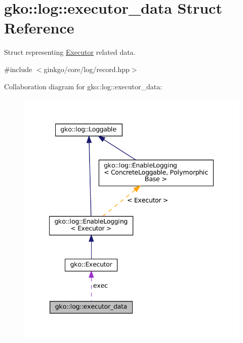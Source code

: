 \hypertarget{structgko_1_1log_1_1executor__data}{}\section{gko\+:\+:log\+:\+:executor\+\_\+data Struct Reference}
\label{structgko_1_1log_1_1executor__data}


Struct representing \hyperlink{classgko_1_1Executor}{Executor} related data.  




{\ttfamily \#include $<$ginkgo/core/log/record.\+hpp$>$}



Collaboration diagram for gko\+:\+:log\+:\+:executor\+\_\+data\+:
\nopagebreak
\begin{figure}[H]
\begin{center}
\leavevmode
\includegraphics[width=341pt]{structgko_1_1log_1_1executor__data__coll__graph}
\end{center}
\end{figure}
